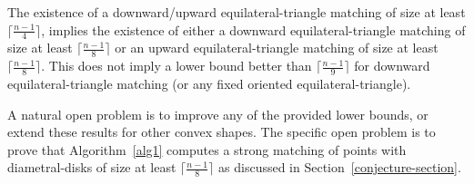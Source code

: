 \documentclass[11pt,a4paper]{article}
\begin{document}
The existence of a downward/upward equilateral-triangle matching of size at least $\lceil\frac{n-1}{4}\rceil$, implies the existence of either a downward equilateral-triangle matching of size at least $\lceil\frac{n-1}{8}\rceil$ or an upward equilateral-triangle matching of size at least $\lceil\frac{n-1}{8}\rceil$. This does not imply a lower bound better than $\lceil\frac{n-1}{9}\rceil$ for downward equilateral-triangle matching (or any fixed oriented equilateral-triangle).

A natural open problem is to improve any of the provided lower bounds, or extend these results for other convex shapes. The specific open problem is to prove that Algorithm~\ref{alg1} computes a strong matching of points with diametral-disks of size at least $\lceil\frac{n-1}{8}\rceil$ as discussed in Section~\ref{conjecture-section}.


\end{document}

